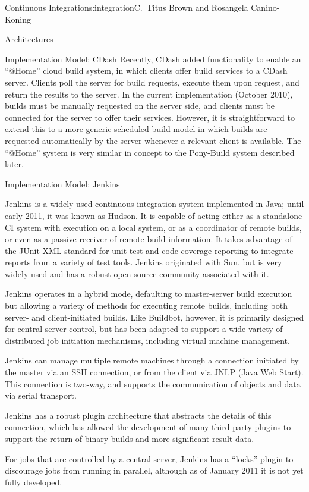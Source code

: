 \begin{aosachapter}{Continuous Integration}{s:integration}{C.\ Titus Brown and Rosangela Canino-Koning}
\begin{aosasect1}{Architectures}
\begin{aosasect2}{Implementation Model: CDash}
Recently, CDash added functionality to enable an ``@Home'' cloud build
system, in which clients offer build services to a CDash server.
Clients poll the server for build requests, execute them upon request,
and return the results to the server.  In the current implementation
(October 2010), builds must be manually requested on the server side,
and clients must be connected for the server to offer their services.
However, it is straightforward to extend this to a more generic
scheduled-build model in which builds are requested automatically by
the server whenever a relevant client is available.  The ``@Home''
system is very similar in concept to the Pony-Build system described
later.

\end{aosasect2}

\begin{aosasect2}{Implementation Model: Jenkins}

Jenkins is a widely used continuous integration system implemented in
Java; until early 2011, it was known as Hudson. It is capable of
acting either as a standalone CI system with execution on a local
system, or as a coordinator of remote builds, or even as a passive
receiver of remote build information. It takes advantage of the JUnit
XML standard for unit test and code coverage reporting to integrate
reports from a variety of test tools. Jenkins originated with Sun, but
is very widely used and has a robust open-source community associated
with it.

Jenkins operates in a hybrid mode, defaulting to master-server build
execution but allowing a variety of methods for executing remote
builds, including both server- and client-initiated builds. Like
Buildbot, however, it is primarily designed for central server
control, but has been adapted to support a wide variety of distributed
job initiation mechanisms, including virtual machine management.

Jenkins can manage multiple remote machines through a connection
initiated by the master via an SSH connection, or from the client via
JNLP (Java Web Start). This connection is two-way, and supports the
communication of objects and data via serial transport. 

Jenkins has a robust plugin architecture that abstracts the details of
this connection, which has allowed the development of many third-party
plugins to support the return of binary builds and more significant
result data.

For jobs that are controlled by a central server, Jenkins has a
``locks'' plugin to discourage jobs from running in parallel, although
as of January 2011 it is not yet fully developed.


\end{aosasect2}
\end{aosasect1}
\end{aosachapter}
